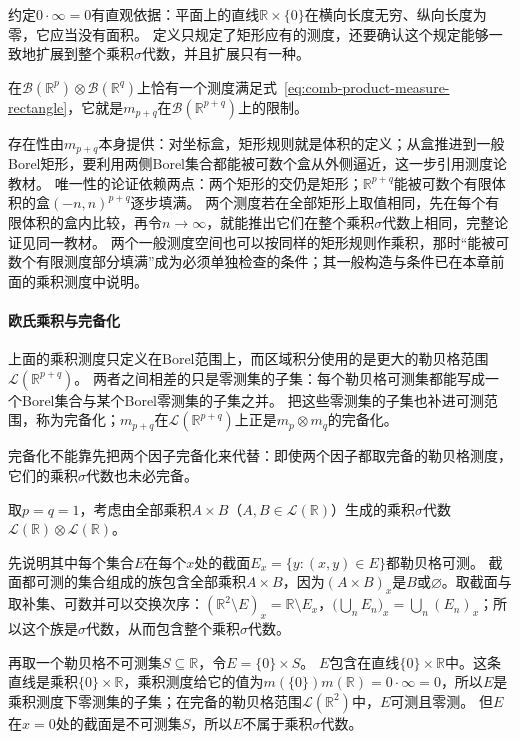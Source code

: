 约定$0\cdot\infty=0$有直观依据：平面上的直线$\mathbb R\times\{0\}$在横向长度无穷、纵向长度为零，它应当没有面积。
定义只规定了矩形应有的测度，还要确认这个规定能够一致地扩展到整个乘积$\sigma$代数，并且扩展只有一种。

\begin{theorem}[乘积测度的存在唯一性]
在$\mathcal B(\mathbb R^p)\otimes\mathcal B(\mathbb R^q)$上恰有一个测度满足式~\eqref{eq:comb-product-measure-rectangle}，它就是$m_{p+q}$在$\mathcal B(\mathbb R^{p+q})$上的限制。
\end{theorem}

存在性由$m_{p+q}$本身提供：对坐标盒，矩形规则就是体积的定义；从盒推进到一般Borel矩形，要利用两侧Borel集合都能被可数个盒从外侧逼近，这一步引用测度论教材。
唯一性的论证依赖两点：两个矩形的交仍是矩形；$\mathbb R^{p+q}$能被可数个有限体积的盒$(-n,n)^{p+q}$逐步填满。
两个测度若在全部矩形上取值相同，先在每个有限体积的盒内比较，再令$n\to\infty$，就能推出它们在整个乘积$\sigma$代数上相同，完整论证见同一教材。
两个一般测度空间也可以按同样的矩形规则作乘积，那时“能被可数个有限测度部分填满”成为必须单独检查的条件；其一般构造与条件已在本章前面的乘积测度中说明。

\paragraph{欧氏乘积与完备化}

上面的乘积测度只定义在Borel范围上，而区域积分使用的是更大的勒贝格范围$\mathcal L(\mathbb R^{p+q})$。
两者之间相差的只是零测集的子集：每个勒贝格可测集都能写成一个Borel集合与某个Borel零测集的子集之并。
把这些零测集的子集也补进可测范围，称为完备化；$m_{p+q}$在$\mathcal L(\mathbb R^{p+q})$上正是$m_p\otimes m_q$的完备化。

完备化不能靠先把两个因子完备化来代替：即使两个因子都取完备的勒贝格测度，它们的乘积$\sigma$代数也未必完备。
\begin{example}
\label{ex:region-product-sigma-algebra-incomplete}
取$p=q=1$，考虑由全部乘积$A\times B$（$A,B\in\mathcal L(\mathbb R)$）生成的乘积$\sigma$代数$\mathcal L(\mathbb R)\otimes\mathcal L(\mathbb R)$。

先说明其中每个集合$E$在每个$x$处的截面$E_x=\{y:(x,y)\in E\}$都勒贝格可测。
截面都可测的集合组成的族包含全部乘积$A\times B$，因为$(A\times B)_x$是$B$或$\varnothing$。取截面与取补集、可数并可以交换次序：$(\mathbb R^2\setminus E)_x=\mathbb R\setminus E_x$，$\bigl(\bigcup_nE_n\bigr)_x=\bigcup_n(E_n)_x$；所以这个族是$\sigma$代数，从而包含整个乘积$\sigma$代数。

再取一个勒贝格不可测集$S\subseteq\mathbb R$，令$E=\{0\}\times S$。
$E$包含在直线$\{0\}\times\mathbb R$中。这条直线是乘积$\{0\}\times\mathbb R$，乘积测度给它的值为$m(\{0\})m(\mathbb R)=0\cdot\infty=0$，所以$E$是乘积测度下零测集的子集；在完备的勒贝格范围$\mathcal L(\mathbb R^2)$中，$E$可测且零测。
但$E$在$x=0$处的截面是不可测集$S$，所以$E$不属于乘积$\sigma$代数。
\end{example}

